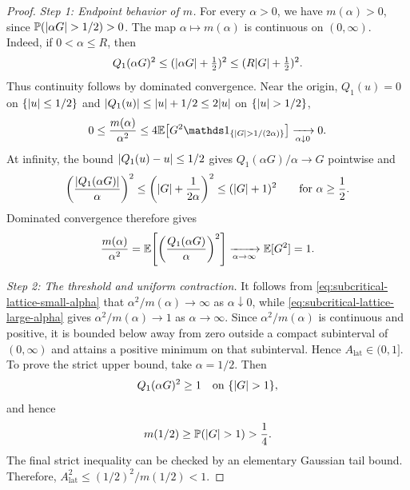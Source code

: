 \documentclass[11pt,reqno,a4paper]{article}
\newcommand{\Pp}{\P}
\newcommand{\Ee}{\E}
\begin{document}
\begin{proof}
  \emph{Step 1: Endpoint behavior of $m$.}
  For every $\alpha>0$, we have $m(\alpha)>0$, since
  $\Pp(\abs{\alpha G}>1/2)>0$. The map $\alpha\mapsto m(\alpha)$ is
  continuous on $(0,\infty)$. Indeed, if $0<\alpha\leq R$, then
  \begin{equation*}
    Q_1(\alpha G)^2
    \leq
    (\abs{\alpha G}+\tfrac12)^2
    \leq
    (R\abs G+\tfrac12)^2 .
  \end{equation*}
  Thus continuity follows by dominated convergence. Near the origin,
  $Q_1(u)=0$ on $\{\abs u\leq1/2\}$ and
  $\abs{Q_1(u)}\leq \abs u+1/2\leq2\abs u$ on
  $\{\abs u>1/2\}$,
  \begin{equation}\label{eq:subcritical-lattice-small-alpha}
    0
    \leq
    \frac{m(\alpha)}{\alpha^2}
    \leq
    4\Ee\left[
      G^2\one_{\{\abs G>1/(2\alpha)\}}
    \right]
    \xrightarrow[\alpha\downarrow0]{}0 .
  \end{equation}
  At infinity, the bound $\abs{Q_1(u)-u}\leq1/2$ gives
  $Q_1(\alpha G)/\alpha\to G$ pointwise and
  \begin{equation*}
    \left(\frac{\abs{Q_1(\alpha G)}}{\alpha}\right)^2
    \leq
    \left(\abs G+\frac1{2\alpha}\right)^2
    \leq
    (\abs G+1)^2
    \qquad\mbox{for }\alpha\geq\frac12 .
  \end{equation*}
  Dominated convergence therefore gives
  \begin{equation}\label{eq:subcritical-lattice-large-alpha}
    \frac{m(\alpha)}{\alpha^2}
    =
    \Ee\left[
      \left(\frac{Q_1(\alpha G)}{\alpha}\right)^2
    \right]
    \xrightarrow[\alpha\to\infty]{}
    \Ee[G^2]
    =
    1 .
  \end{equation}

  \emph{Step 2: The threshold and uniform contraction.}
  It follows from \cref{eq:subcritical-lattice-small-alpha} that
  $\alpha^2/m(\alpha)\to\infty$ as $\alpha\downarrow0$, while
  \cref{eq:subcritical-lattice-large-alpha} gives
  $\alpha^2/m(\alpha)\to1$ as $\alpha\to\infty$. Since
  $\alpha^2/m(\alpha)$ is continuous and positive, it is bounded below away
  from zero outside a compact subinterval of $(0,\infty)$ and attains a
  positive minimum on that subinterval. Hence
  $A_{\mathrm{lat}}\in(0,1]$. To prove the strict upper bound, take
  $\alpha=1/2$. Then
  \begin{equation*}
    Q_1(\alpha G)^2\geq1
    \quad\mbox{on }\{\abs G>1\},
  \end{equation*}
  and hence
  \begin{equation*}
    m(1/2)\geq\Pp(\abs G>1)>\frac14.
  \end{equation*}
  The final strict inequality can be checked by an elementary Gaussian tail
  bound. Therefore,
  $A_{\mathrm{lat}}^2\leq (1/2)^2/m(1/2)<1$.


\end{proof}
\end{document}

